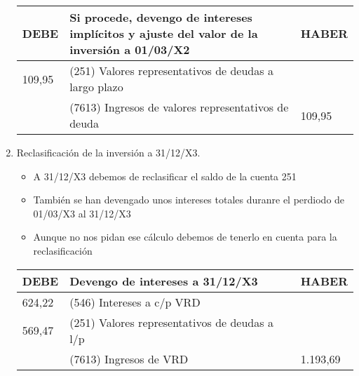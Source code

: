 \begin{enumerate}[label=\alph*)]
    \begin{table}[H]
        \centering
        \begin{tabular}{|p{3cm}|p{6cm}|p{3cm}|}
        \hline
        \rowcolor{blue!30}
        \textbf{DEBE} & \textbf{Si procede, devengo de intereses implícitos y ajuste del valor de la inversión a 01/03/X2} & \textbf{HABER} \\
        \hline
        109,95 & (251) Valores representativos de deudas a largo plazo & \\
        \hline
        & (7613) Ingresos de valores representativos de deuda & 109,95 \\
        \hline
        \end{tabular}
    \end{table}

    \item Reclasificación de la inversión a 31/12/X3.

    \begin{itemize}
        \item A 31/12/X3 debemos de reclasificar el saldo de la cuenta 251 \\
        \item También se han devengado unos intereses totales duranre el perdiodo de 01/03/X3 al 31/12/X3 \\
        \item Aunque no nos pidan ese cálculo debemos de tenerlo en cuenta para la reclasificación
    \end{itemize}

    \begin{table}[H]
        \centering
        \begin{tabular}{|p{3cm}|p{6cm}|p{3cm}|}
        \hline
        \rowcolor{blue!30}
        \textbf{DEBE} & \textbf{Devengo de intereses a 31/12/X3} & \textbf{HABER} \\
        \hline
        624,22 & (546) Intereses a c/p VRD & \\
        \hline
        569,47 & (251) Valores representativos de deudas a l/p & \\
        \hline
        & (7613) Ingresos de VRD & 1.193,69 \\
        \hline
        \end{tabular}
    \end{table}

    \begin{figure}[H]
        \centering
\end{figure}
\end{enumerate}
